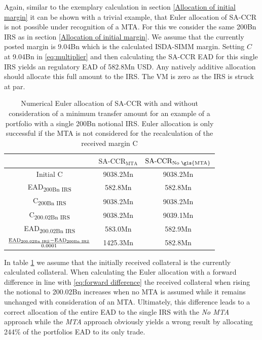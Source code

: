 \documentclass[../Thesis_AHoecherl.tex]{subfiles}
\begin{document}
    Again, similar to the exemplary calculation in section \ref{Allocation of initial margin} it can be shown with a trivial example, that Euler allocation of SA-CCR is not possible under recognition of a \gls{MTA}. 
    For this we consider the same 200Bn \gls{IRS} as in section \ref{Allocation of initial margin}. We assume that the currently posted margin is 9.04Bn which is the calculated ISDA-SIMM margin. 
    Setting $C$ at 9.04Bn in \ref{eq:multiplier} and then calculating the SA-CCR EAD for this single IRS  yields an regulatory EAD of 582.8Mn USD. Any natively additive allocation should allocate this full amount to the IRS.
    The \gls{VM} is zero as the IRS is struck at par.
    \begin{table}[htbp]
        \label{tab:Allocate SA-CCR with MTA calculation}
        \centering
            \begin{tabular}{c|c|c}
                & $\text{SA-CCR}_{\text{MTA}}$ & $\text{SA-CCR}_{\text{No \gls{MTA}}}$ \\
                \toprule
                Initial C & 9038.2Mn & 9038.2Mn \\
                \midrule
                EAD\textsubscript{200Bn IRS} & 582.8Mn & 582.8Mn \\
                \midrule
                C\textsubscript{200Bn IRS} & 9038.2Mn & 9038.2Mn \\
                \midrule
                C\textsubscript{200.02Bn IRS} & 9038.2Mn & 9039.1Mn \\
                \midrule
                EAD\textsubscript{200.02Bn IRS} & 583.0Mn & 582.9Mn \\
                \midrule
                $\frac{\text{EAD\textsubscript{200.02Bn IRS}}-\text{EAD\textsubscript{200Bn IRS}}}{0.0001}$ & 1425.3Mn & 582.8Mn  \\
            \end{tabular}%
        \caption{Numerical Euler allocation of SA-CCR with and without consideration of a minimum transfer amount for an example of a portfolio with a single 200Bn notional IRS. Euler allocation is only successful if the \gls{MTA} is not considered for the recalculation of the received margin C}
    \end{table}
    In table \ref{tab:Allocate SA-CCR with MTA calculation} we assume that the initially received collateral is the currently calculated collateral. 
    When calculating the Euler allocation with a forward difference in line with \ref{eq:forward difference} the received collateral when rising the notional to 200.02Bn increases when no MTA is assumed while it remains unchanged with consideration of an MTA. 
    Ultimately, this difference leads to a correct allocation of the entire EAD to the single IRS with the \emph{No MTA} approach while the \emph{MTA} approach obviously yields a wrong result by allocating 244\% of the portfolios EAD to its only trade.
\end{document}
